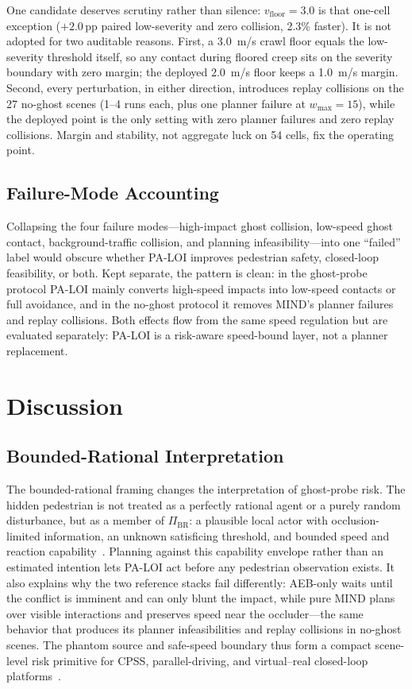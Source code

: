 \documentclass[journal]{IEEEtran}
\begin{document}
One candidate deserves scrutiny rather than silence: $v_{\mathrm{floor}}{=}3.0$ is that one-cell exception ($+2.0$\,pp paired low-severity and zero collision, 2.3\% faster). It is not adopted for two auditable reasons. First, a \SI{3.0}{m/s} crawl floor equals the low-severity threshold itself, so any contact during floored creep sits on the severity boundary with zero margin; the deployed \SI{2.0}{m/s} floor keeps a \SI{1.0}{m/s} margin. Second, every perturbation, in either direction, introduces replay collisions on the 27 no-ghost scenes (1--4 runs each, plus one planner failure at $w_{\max}{=}15$), while the deployed point is the only setting with zero planner failures and zero replay collisions. Margin and stability, not aggregate luck on 54 cells, fix the operating point.

\subsection{Failure-Mode Accounting}

Collapsing the four failure modes---high-impact ghost collision, low-speed ghost contact, background-traffic collision, and planning infeasibility---into one ``failed'' label would obscure whether PA-LOI improves pedestrian safety, closed-loop feasibility, or both. Kept separate, the pattern is clean: in the ghost-probe protocol PA-LOI mainly converts high-speed impacts into low-speed contacts or full avoidance, and in the no-ghost protocol it removes MIND's planner failures and replay collisions. Both effects flow from the same speed regulation but are evaluated separately: PA-LOI is a risk-aware speed-bound layer, not a planner replacement.

\section{Discussion}

\subsection{Bounded-Rational Interpretation}

The bounded-rational framing changes the interpretation of ghost-probe risk. The hidden pedestrian is not treated as a perfectly rational agent or a purely random disturbance, but as a member of $\Pi_{\mathrm{BR}}$: a plausible local actor with occlusion-limited information, an unknown satisficing threshold, and bounded speed and reaction capability~\cite{rasouli2020survey,oxley2005crossing,dang2025bounded}. Planning against this capability envelope rather than an estimated intention lets PA-LOI act before any pedestrian observation exists. It also explains why the two reference stacks fail differently: AEB-only waits until the conflict is imminent and can only blunt the impact, while pure MIND plans over visible interactions and preserves speed near the occluder---the same behavior that produces its planner infeasibilities and replay collisions in no-ghost scenes. The phantom source and safe-speed boundary thus form a compact scene-level risk primitive for CPSS, parallel-driving, and virtual--real closed-loop platforms~\cite{wang2010parallel,wang2017parallel,wang2024parallel}.
\end{document}
